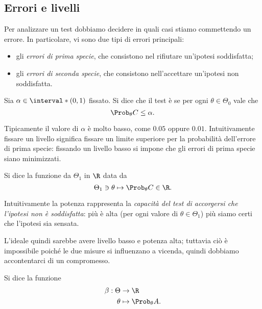 \subsection*{Errori e livelli}

Per analizzare un test dobbiamo decidere in quali casi stiamo commettendo un errore. In particolare, vi sono due tipi di errori principali:
\begin{itemize}
    \item gli \emph{errori di prima specie}, che consistono nel rifiutare un'ipotesi soddisfatta;
    \item gli \emph{errori di seconda specie}, che consistono nell'accettare un'ipotesi non soddisfatta.
\end{itemize}

\begin{definition}
     Sia $\alpha \in \interval*({0, 1})$ fissato. Si dice che il test è  se per ogni $\theta \in \Theta_0$ vale che \[
        \Prob_{\theta}{C} \leq \alpha.    
    \]
\end{definition}

Tipicamente il valore di $\alpha$ è molto basso, come $0.05$ oppure $0.01$. Intuitivamente fissare un livello significa fissare un limite superiore per la probabilità dell'errore di prima specie: fissando un livello basso si impone che gli errori di prima specie siano minimizzati.

\begin{definition}
    Si dice  la funzione da $\Theta_1$ in $\R$ data da \[
        \Theta_1 \ni \theta \mapsto \Prob_\theta{C} \in \R.    
    \]
\end{definition}

Intuitivamente la potenza rappresenta la \emph{capacità del test di accorgersi che l'ipotesi non è soddisfatta}: più è alta (per ogni valore di $\theta \in \Theta_1$) più siamo certi che l'ipotesi sia sensata.

L'ideale quindi sarebbe avere livello basso e potenza alta; tuttavia ciò è impossibile poiché le due misure si influenzano a vicenda, quindi dobbiamo accontentarci di un compromesso.

\begin{definition}
    Si dice  la funzione \begin{align*}
        \beta : \Theta &\to \R\\
        \theta &\mapsto \Prob_{\theta}{A}.
    \end{align*}
\end{definition}

